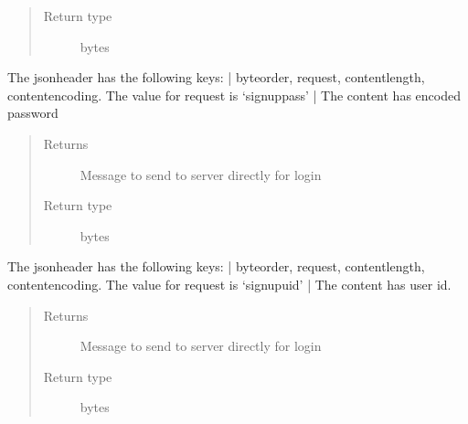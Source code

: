 \documentclass[letterpaper,10pt,english]{sphinxmanual}
\begin{document}
\begin{fulllineitems}
\begin{fulllineitems}
\begin{quote}
\begin{description}
\item[{Return type}] \leavevmode
bytes

\end{description}\end{quote}

\end{fulllineitems}


\begin{fulllineitems}
\label{\detokenize{Message:Message.Message._create_signuppass_request}}
The jsonheader has the following keys: |
byteorder, request, content\sphinxhyphen{}length, content\sphinxhyphen{}encoding. The value for request is ‘signuppass’ |
The content has encoded password
\begin{quote}\begin{description}
\item[{Returns}] \leavevmode
Message to send to server directly for login

\item[{Return type}] \leavevmode
bytes

\end{description}\end{quote}

\end{fulllineitems}


\begin{fulllineitems}
\label{\detokenize{Message:Message.Message._create_signupuid_request}}
The jsonheader has the following keys: |
byteorder, request, content\sphinxhyphen{}length, content\sphinxhyphen{}encoding. The value for request is ‘signupuid’ |
The content has user id.
\begin{quote}\begin{description}
\item[{Returns}] \leavevmode
Message to send to server directly for login

\item[{Return type}] \leavevmode
bytes


\end{description}
\end{quote}
\end{fulllineitems}
\end{fulllineitems}
\end{document}
